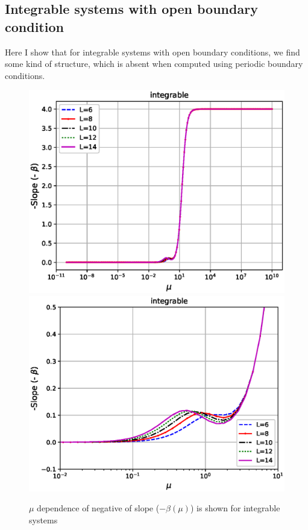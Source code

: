 \documentclass[11pt,a4paper]{article}
\begin{document}
\subsection{Integrable systems with open boundary condition}

Here I show that for integrable systems with open boundary conditions, we find some kind of structure, which is absent when computed using periodic boundary conditions.

\begin{figure}[ht!]
\begin{center}
\includegraphics[scale=0.5]{new_pics/v3_slope_int_semilogx.eps} 
\includegraphics[scale=0.5]{new_pics/v3_slope_int_semilogx_zoom.eps}
\caption{$\mu$ dependence of negative of slope ($-\beta (\mu)$) is shown for  integrable systems }
\label{slope_integrable_mu}
\end{center}
\end{figure}

 


%
\end{document}
